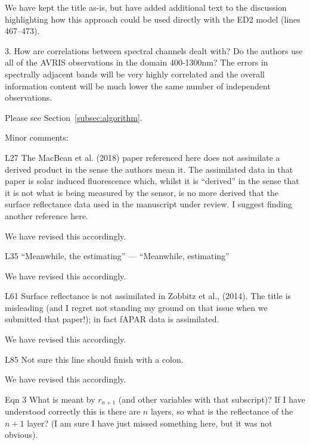 We have kept the title as-is, but have added additional text to the discussion highlighting how this approach could be used directly with the ED2 model (lines 467--473).

\begin{reviewer}
  3. How are correlations between spectral channels dealt with? Do the authors use all of the AVRIS observations in the domain 400-1300nm? The errors in spectrally adjacent bands will be very highly correlated and the overall information content will be much lower the same number of independent observations.
\end{reviewer}

Please see Section~\ref{subsec:algorithm}.

\begin{reviewer}
Minor comments:

L27 The MacBean et al. (2018) paper referenced here does not assimilate a derived product in the sense the authors mean it. The assimilated data in that paper is solar induced fluorescence which, whilst it is “derived” in the sense that it is not what is being measured by the sensor, is no more derived that the surface reflectance data used in the manuscript under review. I suggest finding another reference here.
\end{reviewer}

We have revised this accordingly.

\begin{reviewer}
L35 “Meanwhile, the estimating” --- “Meanwhile, estimating”
\end{reviewer}

We have revised this accordingly.

\begin{reviewer}
L61 Surface reflectance is not assimilated in Zobbitz et al., (2014). The title is misleading (and I regret not standing my ground on that issue when we submitted that paper!); in fact fAPAR data is assimilated.
\end{reviewer}

We have revised this accordingly.

\begin{reviewer}
L85 Not sure this line should finish with a colon.
\end{reviewer}

We have revised this accordingly.

\begin{reviewer}
Eqn 3 What is meant by $r_{n+1}$ (and other variables with that subscript)? If I have understood correctly this is there are $n$ layers, so what is the reflectance of the $n + 1$ layer? (I am sure I have just missed something here, but it was not obvious).
\end{reviewer}

